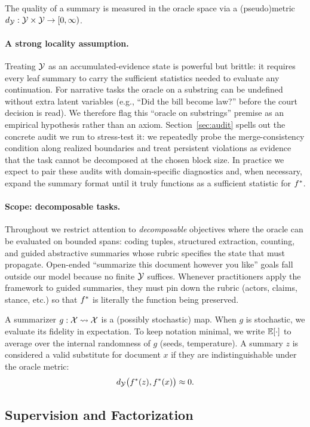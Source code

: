 The quality of a summary is measured in the oracle space via a (pseudo)metric $d_{\mathcal{Y}}: \mathcal{Y} \times \mathcal{Y} \to [0, \infty)$.

\paragraph{A strong locality assumption.}
Treating $\mathcal{Y}$ as an accumulated-evidence state is powerful but brittle: it requires every leaf summary to carry the sufficient statistics needed to evaluate any continuation. For narrative tasks the oracle on a substring can be undefined without extra latent variables (e.g., ``Did the bill become law?'' before the court decision is read). We therefore flag this ``oracle on substrings'' premise as an empirical hypothesis rather than an axiom. Section~\ref{sec:audit} spells out the concrete audit we run to stress-test it: we repeatedly probe the merge-consistency condition along realized boundaries and treat persistent violations as evidence that the task cannot be decomposed at the chosen block size. In practice we expect to pair these audits with domain-specific diagnostics and, when necessary, expand the summary format until it truly functions as a sufficient statistic for $f^{\ast}$.

\paragraph{Scope: decomposable tasks.}
Throughout we restrict attention to \emph{decomposable} objectives where the oracle can be evaluated on bounded spans: coding tuples, structured extraction, counting, and guided abstractive summaries whose rubric specifies the state that must propagate. Open-ended ``summarize this document however you like'' goals fall outside our model because no finite $\mathcal{Y}$ suffices. Whenever practitioners apply the framework to guided summaries, they must pin down the rubric (actors, claims, stance, etc.) so that $f^{\ast}$ is literally the function being preserved.

A summarizer $g: \mathcal{X} \rightsquigarrow \mathcal{X}$ is a (possibly stochastic) map. When $g$ is stochastic, we evaluate its fidelity in expectation. To keep notation minimal, we write $\mathbb{E}[\cdot]$ to average over the internal randomness of $g$ (seeds, temperature). A summary $z$ is considered a valid substitute for document $x$ if they are indistinguishable under the oracle metric:
\[
d_{\mathcal{Y}}\big(f^{\ast}(z), f^{\ast}(x)\big) \approx 0.
\]

\subsection{Supervision and Factorization}

